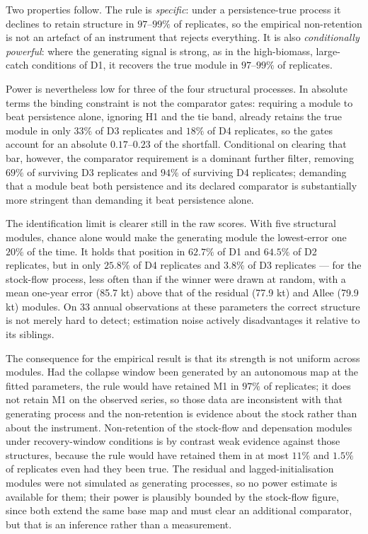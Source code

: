 \documentclass[11pt]{article}
\begin{document}
Two properties follow. The rule is \emph{specific}: under a
persistence-true process it declines to retain structure in \(97\)--\(99\%\)
of replicates, so the empirical non-retention is not an artefact of an
instrument that rejects everything. It is also \emph{conditionally
powerful}: where the generating signal is strong, as in the
high-biomass, large-catch conditions of D1, it recovers the true module
in \(97\)--\(99\%\) of replicates.

Power is nevertheless low for three of the four structural processes.
In absolute terms the binding constraint is not the comparator gates:
requiring a module to beat persistence alone, ignoring H1 and the tie
band, already retains the true module in only \(33\%\) of D3 replicates
and \(18\%\) of D4 replicates, so the gates account for an absolute
\(0.17\)--\(0.23\) of the shortfall. Conditional on clearing that bar,
however, the comparator requirement is a dominant further filter,
removing \(69\%\) of surviving D3 replicates and \(94\%\) of surviving
D4 replicates; demanding that a module beat both persistence and its
declared comparator is substantially more stringent than demanding it
beat persistence alone.

The identification limit is clearer still in the raw scores. With five
structural modules, chance alone would make the generating module the
lowest-error one \(20\%\) of the time. It holds that position in
\(62.7\%\) of D1 and \(64.5\%\) of D2 replicates, but in only \(25.8\%\)
of D4 replicates and \(3.8\%\) of D3 replicates --- for the stock-flow
process, less often than if the winner were drawn at random, with a mean
one-year error (85.7 kt) above that of the residual (77.9 kt) and Allee
(79.9 kt) modules. On 33 annual observations at these parameters the
correct structure is not merely hard to detect; estimation noise
actively disadvantages it relative to its siblings.

The consequence for the empirical result is that its strength is not
uniform across modules. Had the collapse window been generated by an
autonomous map at the fitted parameters, the rule would have retained
M1 in \(97\%\) of replicates; it does not retain M1 on the observed
series, so those data are inconsistent with that generating process and
the non-retention is evidence about the stock rather than about the
instrument. Non-retention of the stock-flow and depensation modules
under recovery-window conditions is by contrast weak evidence against
those structures, because the rule would have retained them in at most
\(11\%\) and \(1.5\%\) of replicates even had they been true. The
residual and lagged-initialisation modules were not simulated as
generating processes, so no power estimate is available for them; their
power is plausibly bounded by the stock-flow figure, since both extend
the same base map and must clear an additional comparator, but that is
an inference rather than a measurement.
\end{document}
